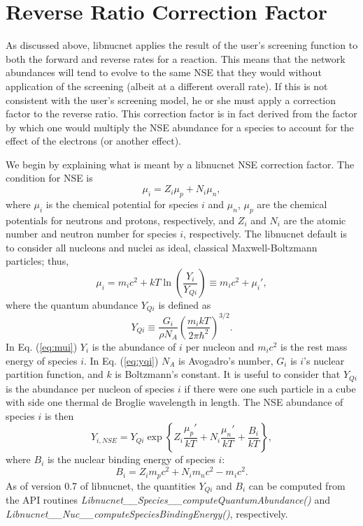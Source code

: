 \documentclass{article}    %
\begin{document}
\section{Reverse Ratio Correction Factor}

As discussed above, libnucnet applies the result of the user's screening
function to both the forward and reverse rates for a reaction.  This means
that the network abundances will tend to evolve to the same NSE that they
would without application of the screening (albeit at a different overall
rate).  If this is not consistent with the user's screening model, he or she
must apply a correction factor to the reverse ratio.  This correction factor
is in fact derived from the
factor by which one would multiply the NSE abundance for
a species to account for the effect of the electrons (or another effect).

We begin by explaining
what is meant by a libnucnet NSE correction factor.
The condition for
NSE is
\begin{equation}
\mu_i = Z_i \mu_p + N_i \mu_n, \label{eq:nse_condition}
\end{equation}
where $\mu_i$ is the chemical potential for species $i$ and $\mu_n$, $\mu_p$
are the chemical potentials for neutrons and protons, respectively, and
$Z_i$ and $N_i$ are the atomic number and neutron number for species $i$, 
respectively.  The libnucnet default is to consider all nucleons and nuclei
as ideal, classical Maxwell-Boltzmann particles; thus,
\begin{equation}
\mu_i = m_i c^2 + kT \ln\left(\frac{Y_i}{Y_{Qi}}\right)
\equiv m_i c^2 + \mu_i',\label{eq:classical_mu}
\label{eq:mui}
\end{equation}
where the quantum abundance $Y_{Qi}$ is defined as
\begin{equation}
Y_{Qi} \equiv \frac{G_i}{\rho N_A}
\left(\frac{m_i kT}{2\pi\hbar^2}\right)^{3/2}.
\label{eq:yqi}
\end{equation}
In Eq. (\ref{eq:mui}) $Y_i$ is the abundance of $i$ per nucleon and
$m_ic^2$ is the rest mass energy of species $i$.
In Eq. (\ref{eq:yqi})
$N_A$ is Avogadro's number,
$G_i$ is $i$'s nuclear partition function, and $k$ is Boltzmann's constant.
It is useful to consider that $Y_{Qi}$ is the abundance per nucleon of species
$i$ if there were one such particle in a cube with side
one thermal de Broglie wavelength in length.
The NSE abundance of species $i$ is then
\begin{equation}
Y_{i,NSE} = Y_{Qi}\exp\left\{Z_i \frac{\mu_p'}{kT} + N_i \frac{\mu_n'}{kT}
+ \frac{B_i}{kT}\right\}, \label{eq:y_i_nse}
\end{equation}
where $B_i$ is the nuclear binding energy of species $i$:
\begin{equation}
B_i = Z_i m_pc^2 + N_i m_nc^2 - m_ic^2.\label{eq:binding}
\end{equation}
As of version 0.7 of libnucnet, the quantities $Y_{Qi}$ and $B_i$ can be
computed from the API routines
{\em Libnucnet\_\_Species\_\_computeQuantumAbundance()}
and
{\em Libnucnet\_\_Nuc\_\_computeSpeciesBindingEnergy()},
respectively.
\end{document}
